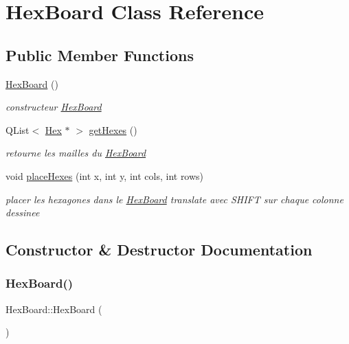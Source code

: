 \hypertarget{class_hex_board}{}\section{Hex\+Board Class Reference}
\label{class_hex_board}
\subsection*{Public Member Functions}
\begin{DoxyCompactItemize}
\item 
\mbox{\hyperlink{class_hex_board_a7e5bdd378237e42eb5eda22f95a16879}{Hex\+Board}} ()
\begin{DoxyCompactList}\small\item\em constructeur \mbox{\hyperlink{class_hex_board}{Hex\+Board}} \end{DoxyCompactList}\item 
Q\+List$<$ \mbox{\hyperlink{class_hex}{Hex}} $\ast$ $>$ \mbox{\hyperlink{class_hex_board_a375493699d1268b59f93625812ece8fb}{get\+Hexes}} ()
\begin{DoxyCompactList}\small\item\em retourne les mailles du \mbox{\hyperlink{class_hex_board}{Hex\+Board}} \end{DoxyCompactList}\item 
void \mbox{\hyperlink{class_hex_board_ae418ecdb15d5b54245298196eeb62e0f}{place\+Hexes}} (int x, int y, int cols, int rows)
\begin{DoxyCompactList}\small\item\em placer les hexagones dans le \mbox{\hyperlink{class_hex_board}{Hex\+Board}} translate avec S\+H\+I\+FT sur chaque colonne dessinee \end{DoxyCompactList}\end{DoxyCompactItemize}


\subsection{Constructor \& Destructor Documentation}
\mbox{\label{class_hex_board_a7e5bdd378237e42eb5eda22f95a16879}} 
\subsubsection{\texorpdfstring{HexBoard()}{HexBoard()}}
{\footnotesize\ttfamily Hex\+Board\+::\+Hex\+Board (\begin{DoxyParamCaption}{ }\end{DoxyParamCaption})}



